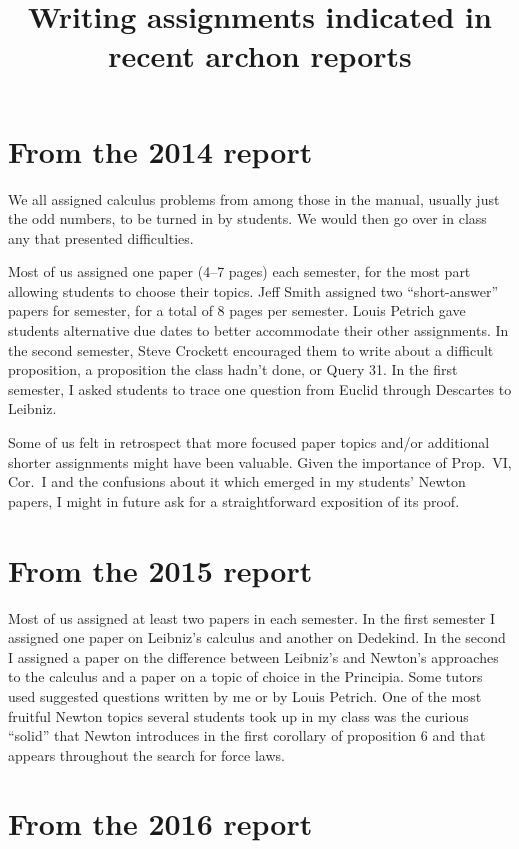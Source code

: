 \documentclass{article}
\title{Writing assignments indicated in recent archon reports}
\date{}
\begin{document}
\maketitle
\section{From the 2014 report}
We all assigned calculus problems from among those in the manual, usually just the odd numbers, to be turned in by students. We would then go over in class any that presented difficulties.

Most of us assigned one paper (4--7 pages) each semester, for the most part allowing students to choose their topics. Jeff Smith assigned two ``short-answer'' papers for semester, for a total of 8 pages per semester. Louis Petrich gave students alternative due dates to better accommodate their other assignments. In the second semester, Steve Crockett encouraged them to write about a difficult proposition, a proposition the class hadn't done, or Query 31. In the first semester, I asked students to trace one question from Euclid through Descartes to Leibniz.

Some of us felt in retrospect that more focused paper topics and/or additional shorter assignments might have been valuable. Given the importance of Prop.~VI, Cor.~I and the confusions about it which emerged in my students' Newton papers, I might in future ask for a straightforward exposition of its proof.

\section{From the 2015 report}
Most of us assigned at least two papers in each semester. In the first semester I assigned one paper on Leibniz's calculus and another on Dedekind. In the second I assigned a paper on the difference between Leibniz's and Newton's approaches to the calculus and a paper on a topic of choice in the Principia. Some tutors used suggested questions written by me or by Louis Petrich. One of the most fruitful Newton topics several students took up in my class was the curious ``solid'' that Newton introduces in the first corollary of proposition 6 and that appears throughout the search for force laws.
\section{From the 2016 report}
\end{document}
